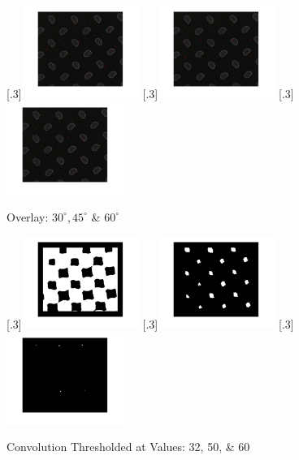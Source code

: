 \documentclass[a4paper]{article}
\begin{document}
	\begin{figure}[H]
		\centering
		[.3\linewidth]{\includegraphics[height=3cm]{Results/Q3/a/qaOverlay30.jpg}}%
		[.3\linewidth]{\includegraphics[height=3cm]{Results/Q3/a/qaOverlay45.jpg}}%
		[.3\linewidth]{\includegraphics[height=3cm]{Results/Q3/a/qaOverlay60.jpg}}%
		\caption{Overlay: $30^\circ, 45^\circ$ \& $60^\circ$}
		\label{fig:}
	\end{figure}
	\begin{figure}[H]
		\centering
		[.3\linewidth]{\includegraphics[height=3cm]{Results/Q3/a/qaThreshVal32.jpg}}%
		[.3\linewidth]{\includegraphics[height=3cm]{Results/Q3/a/qaThreshVal50.jpg}}%
		[.3\linewidth]{\includegraphics[height=3cm]{Results/Q3/a/qaThreshVal60.jpg}}%
		\caption{Convolution Thresholded at Values: 32, 50, \& 60}
		\label{fig:}
	\end{figure}
\end{document}

